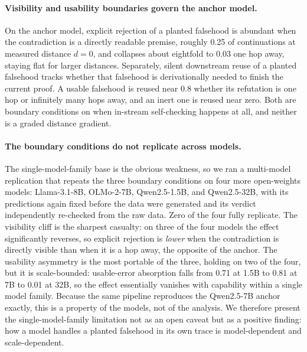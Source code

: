 \paragraph{Visibility and usability boundaries govern the anchor model.} On
the anchor model, explicit rejection of a planted falsehood
is abundant when the contradiction is a directly readable premise, roughly
0.25 of continuations at measured distance $d{=}0$, and collapses about
eightfold to 0.03 one hop away, staying flat for larger distances.
Separately, silent downstream reuse of a planted falsehood tracks whether
that falsehood is derivationally needed to finish the current proof. A
usable falsehood is reused near 0.8 whether its refutation is one hop or
infinitely many hops away, and an inert one is reused near zero.
Both are boundary conditions on when in-stream self-checking happens at
all, and neither is a graded distance gradient.

\paragraph{The boundary conditions do not replicate across models.} The
single-model-family base is the obvious weakness, so we ran a multi-model
replication that repeats the three boundary conditions on four more
open-weights models: Llama-3.1-8B, OLMo-2-7B, Qwen2.5-1.5B, and
Qwen2.5-32B, with its predictions again fixed before the data were
generated and its verdict independently re-checked from the raw data.
Zero of the four fully replicate. The visibility cliff is the sharpest
casualty: on three of the four models the effect significantly reverses, so
explicit rejection is \emph{lower} when the contradiction is directly
visible than when it is a hop away, the opposite of the anchor.
The usability asymmetry is the most portable of the three, holding on two
of the four, but it is scale-bounded: usable-error absorption falls from
0.71 at 1.5B to 0.81 at 7B to 0.01 at 32B, so the effect essentially
vanishes with capability within a single model family.
Because the same pipeline reproduces the Qwen2.5-7B anchor exactly, this is
a property of the models, not of the analysis. We therefore present the
single-model-family limitation not as an open caveat but as a positive
finding: how a model handles a planted falsehood in its own trace is
model-dependent and scale-dependent.

